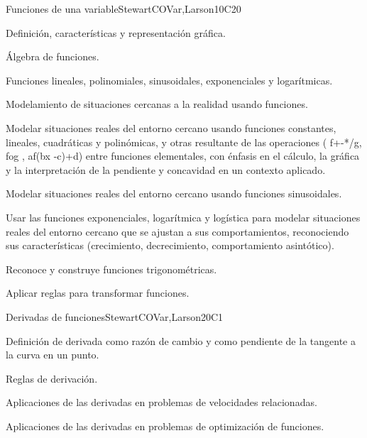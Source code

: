 \begin{syllabus}
\begin{unit}{Funciones de una variable}{}{StewartCOVar,Larson}{10}{C20}
   \begin{topics}
      \item Definición, características y representación gráfica.
      \item Álgebra de funciones.
      \item Funciones lineales, polinomiales, sinusoidales, exponenciales y logarítmicas.
      \item Modelamiento de situaciones cercanas a la realidad usando funciones.
   \end{topics}

   \begin{learningoutcomes}
      \item Modelar situaciones reales del entorno cercano usando funciones constantes, lineales, cuadráticas y polinómicas, y otras resultante de las operaciones ( f+-*/g, fog  , af(bx -c)+d) entre funciones elementales, con énfasis en el cálculo, la gráfica y la interpretación de la pendiente y concavidad en un contexto aplicado. 
      \item Modelar situaciones reales del entorno cercano usando funciones sinusoidales.
      \item Usar las funciones exponenciales, logarítmica y logística para modelar situaciones reales del entorno cercano que se ajustan a sus comportamientos, reconociendo sus características (crecimiento, decrecimiento, comportamiento asintótico).
      \item Reconoce y construye funciones trigonométricas.
      \item Aplicar reglas para transformar funciones.
      \end{learningoutcomes}
\end{unit}

\begin{unit}{Derivadas de funciones}{}{StewartCOVar,Larson}{20}{C1}
   \begin{topics}
      \item Definición de derivada como razón de cambio y como pendiente de la tangente a la curva en un punto.
      \item Reglas de derivación.
      \item Aplicaciones de las derivadas en problemas de velocidades relacionadas.
      \item Aplicaciones de las derivadas en problemas de optimización de funciones.
   \end{topics}


\end{unit}
\end{syllabus}
